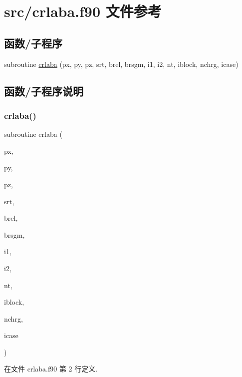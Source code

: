 \hypertarget{crlaba_8f90}{}\section{src/crlaba.f90 文件参考}
\label{crlaba_8f90}
\subsection*{函数/子程序}
\begin{DoxyCompactItemize}
\item 
subroutine \mbox{\hyperlink{crlaba_8f90_af988ecb78f47119554e7033745f448bd}{crlaba}} (px, py, pz, srt, brel, brsgm, i1, i2, nt, iblock, nchrg, icase)
\end{DoxyCompactItemize}


\subsection{函数/子程序说明}
\mbox{\label{crlaba_8f90_af988ecb78f47119554e7033745f448bd}} 
\subsubsection{\texorpdfstring{crlaba()}{crlaba()}}
{\footnotesize\ttfamily subroutine crlaba (\begin{DoxyParamCaption}\item[{}]{px,  }\item[{}]{py,  }\item[{}]{pz,  }\item[{}]{srt,  }\item[{}]{brel,  }\item[{}]{brsgm,  }\item[{}]{i1,  }\item[{}]{i2,  }\item[{}]{nt,  }\item[{}]{iblock,  }\item[{}]{nchrg,  }\item[{}]{icase }\end{DoxyParamCaption})}



在文件 crlaba.\+f90 第 2 行定义.

